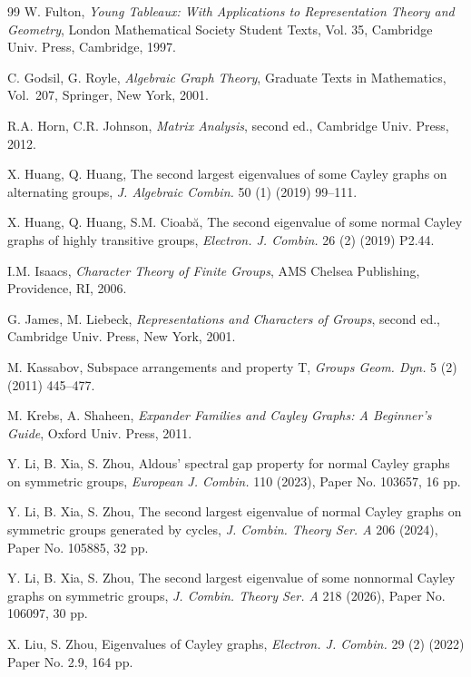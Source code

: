 \documentclass[12pt, a4paper]{article}
\theoremstyle{definition}
\begin{document}
\begin{thebibliography}{99}
W. Fulton, {\em Young Tableaux: With Applications to Representation Theory and Geometry}, London Mathematical Society Student Texts, Vol. 35, Cambridge Univ. Press, Cambridge, 1997.

C. Godsil, G. Royle, {\em Algebraic Graph Theory}, Graduate Texts in Mathematics, Vol.~207, Springer, New York, 2001.




R.A. Horn, C.R. Johnson, {\em Matrix Analysis}, second ed., Cambridge Univ. Press, 2012.

X. Huang, Q. Huang, The second largest eigenvalues of some Cayley graphs on alternating groups, {\em J. Algebraic Combin.} 50 (1) (2019) 99--111.

X. Huang, Q. Huang, S.M. Cioab\u{a}, The second eigenvalue of some normal Cayley graphs of highly transitive groups, {\em Electron. J. Combin.} 26 (2) (2019) P2.44.

I.M. Isaacs, {\em Character Theory of Finite Groups}, AMS Chelsea Publishing, Providence, RI, 2006.





G. James, M. Liebeck, {\em Representations and Characters of Groups}, second ed., Cambridge Univ. Press, New York, 2001.

M. Kassabov, Subspace arrangements and property T, {\em Groups Geom. Dyn.} 5 (2) (2011) 445--477.

M. Krebs, A. Shaheen, {\em Expander Families and Cayley Graphs: A Beginner’s Guide}, Oxford Univ. Press, 2011.



Y. Li, B. Xia, S. Zhou, Aldous' spectral gap property for normal Cayley graphs on symmetric groups, {\em European J. Combin.} 110 (2023), Paper No. 103657, 16 pp.

Y. Li, B. Xia, S. Zhou, The second largest eigenvalue of normal Cayley graphs on symmetric groups generated by cycles, {\em J. Combin. Theory Ser. A} 206 (2024), Paper No. 105885, 32 pp.

Y. Li, B. Xia, S. Zhou, The second largest eigenvalue of some nonnormal Cayley graphs on symmetric groups, {\em J. Combin. Theory Ser. A} 218 (2026), Paper No. 106097, 30 pp.

X. Liu, S. Zhou, Eigenvalues of Cayley graphs, {\em Electron. J. Combin.} 29 (2) (2022) Paper No. 2.9, 164 pp.


\end{thebibliography}
\end{document}
